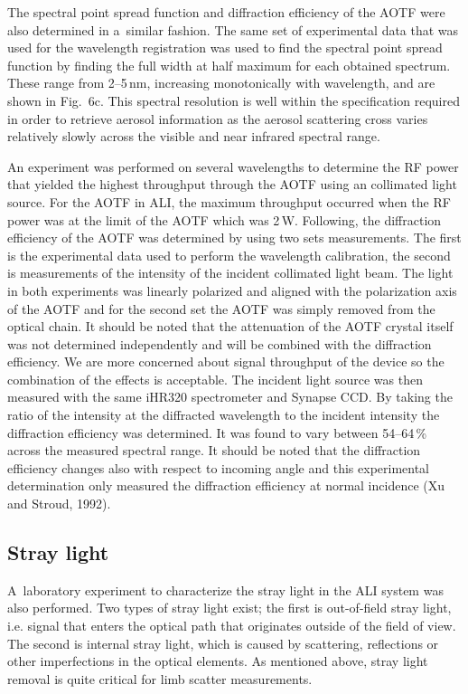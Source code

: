 \documentclass[amtd, online, hvmath]{copernicus}
\begin{document}
The spectral point spread function and diffraction efficiency of the
AOTF were also determined in a~similar fashion. The same set of
experimental data that was used for the wavelength registration was
used to find the spectral point spread function by finding the full
width at half maximum for each obtained spectrum. These range from
2--5\,\unit{nm}, increasing monotonically with wavelength, and are
shown in Fig.~6c. This spectral resolution is well within the
specification required in order to retrieve aerosol information as the
aerosol scattering cross varies relatively slowly across the visible
and near infrared spectral range.

An experiment was performed on several wavelengths to determine the RF power that yielded the highest throughput through the AOTF using an collimated light source. For the AOTF in ALI, the maximum throughput occurred when the RF power was at the limit of the AOTF which was 2\,W. Following, the diffraction efficiency of the AOTF was determined by using two sets measurements. The first is the experimental data used to perform the wavelength calibration, the second is measurements of the intensity of the incident collimated light beam. The light in both experiments was linearly polarized and aligned with the polarization axis of the AOTF and for the second set the AOTF was simply removed from the optical chain. It should be noted that the attenuation of the AOTF crystal itself was not determined independently and will be combined with the diffraction efficiency. We are more concerned about signal throughput of the device so the combination of the effects is acceptable. The incident light source was then measured with the same iHR320 spectrometer and Synapse CCD. By taking the ratio of the intensity at the diffracted wavelength to the incident intensity the diffraction efficiency was determined. It was found to vary between
54--64\,{\%} across the measured spectral range. It should be noted
that the diffraction efficiency changes also with respect to incoming
angle and this experimental determination only measured the
diffraction efficiency at normal incidence (Xu and Stroud, 1992).

\subsection{Stray light}

A~laboratory experiment to characterize the stray light in the ALI
system was also performed. Two types of stray light exist; the first
is out-of-field stray light, i.e. signal that enters the optical path
that originates outside of the field of view. The second is internal
stray light, which is caused by scattering, reflections or other
imperfections in the optical elements. As mentioned above, stray light
removal is quite critical for limb scatter measurements.
\end{document}
